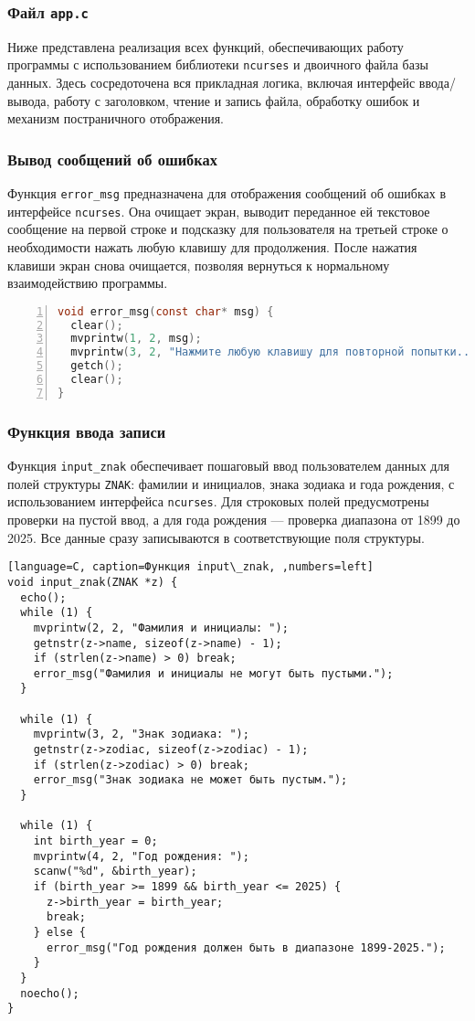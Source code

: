 \subsubsection*{Файл \texttt{app.c}}

Ниже представлена реализация всех функций, обеспечивающих работу программы с использованием библиотеки \texttt{ncurses} и двоичного файла базы данных. Здесь сосредоточена вся прикладная логика, включая интерфейс ввода/вывода, работу с заголовком, чтение и запись файла, обработку ошибок и механизм постраничного отображения.

\subsubsection*{Вывод сообщений об ошибках}

Функция \texttt{error\_msg} предназначена для отображения сообщений об ошибках в интерфейсе \texttt{ncurses}. Она очищает экран, выводит переданное ей текстовое сообщение на первой строке и подсказку для пользователя на третьей строке о необходимости нажать любую клавишу для продолжения. После нажатия клавиши экран снова очищается, позволяя вернуться к нормальному взаимодействию программы.

\begin{lstlisting}[language=C, caption=Функция error\_msg, numbers=left]
void error_msg(const char* msg) {
  clear();
  mvprintw(1, 2, msg);
  mvprintw(3, 2, "Нажмите любую клавишу для повторной попытки...");
  getch();
  clear();
}
\end{lstlisting}

\subsubsection*{Функция ввода записи}

Функция \texttt{input\_znak} обеспечивает пошаговый ввод пользователем данных для полей структуры \texttt{ZNAK}: фамилии и инициалов, знака зодиака и года рождения, с использованием интерфейса \texttt{ncurses}. Для строковых полей предусмотрены проверки на пустой ввод, а для года рождения — проверка диапазона от 1899 до 2025. Все данные сразу записываются в соответствующие поля структуры.

\begin{lstlisting}[language=C, caption=Функция input\_znak, ,numbers=left]
void input_znak(ZNAK *z) {
  echo();
  while (1) {
    mvprintw(2, 2, "Фамилия и инициалы: ");
    getnstr(z->name, sizeof(z->name) - 1);
    if (strlen(z->name) > 0) break;
    error_msg("Фамилия и инициалы не могут быть пустыми.");
  }

  while (1) {
    mvprintw(3, 2, "Знак зодиака: ");
    getnstr(z->zodiac, sizeof(z->zodiac) - 1);
    if (strlen(z->zodiac) > 0) break;
    error_msg("Знак зодиака не может быть пустым.");
  }

  while (1) {
    int birth_year = 0;
    mvprintw(4, 2, "Год рождения: ");
    scanw("%d", &birth_year);
    if (birth_year >= 1899 && birth_year <= 2025) {
      z->birth_year = birth_year;
      break;
    } else {
      error_msg("Год рождения должен быть в диапазоне 1899-2025.");
    }
  }
  noecho();
}
\end{lstlisting}

